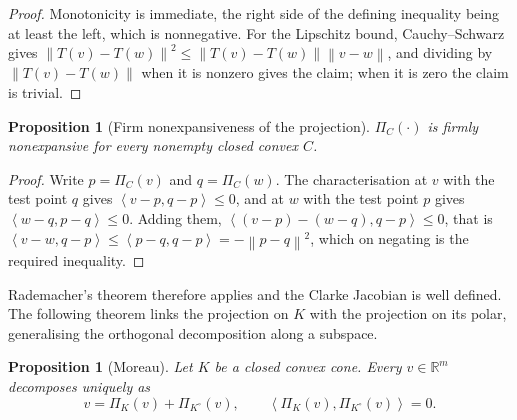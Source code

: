 \documentclass[a4paper,11pt]{book}
\theoremstyle{plain}
\newtheorem{proposition}[theorem]{Proposition}
\theoremstyle{definition}
\theoremstyle{remark}
\numberwithin{equation}{chapter}
\numberwithin{algorithm}{chapter}
\newcommand{\R}{\mathbb{R}}
\newcommand{\proj}[2]{\Pi_{#2}\!\left(#1\right)}
\newcommand{\norm}[1]{\left\|#1\right\|}
\newcommand{\inner}[2]{\left\langle #1, #2 \right\rangle}
\begin{document}
	\begin{proof}
		Monotonicity is immediate, the right side of the defining inequality being at
		least the left, which is nonnegative. For the Lipschitz bound, Cauchy--Schwarz
		gives $\norm{T(v)-T(w)}^2\leq\norm{T(v)-T(w)}\norm{v-w}$, and dividing by
		$\norm{T(v)-T(w)}$ when it is nonzero gives the claim; when it is zero the
		claim is trivial.
	\end{proof}
	
	\begin{proposition}[Firm nonexpansiveness of the projection]
		$\proj{\cdot}{C}$ is firmly nonexpansive for every nonempty closed convex $C$.
	\end{proposition}
	
	\begin{proof}
		Write $p=\proj{v}{C}$ and $q=\proj{w}{C}$. The characterisation at $v$ with the
		test point $q$ gives $\inner{v-p}{q-p}\leq0$, and at $w$ with the test point
		$p$ gives $\inner{w-q}{p-q}\leq0$. Adding them,
		$\inner{(v-p)-(w-q)}{q-p}\leq0$, that is
		$\inner{v-w}{q-p}\leq\inner{p-q}{q-p}=-\norm{p-q}^2$, which on negating is the
		required inequality.
	\end{proof}
	
	
	Rademacher's theorem therefore applies and the Clarke Jacobian is well
	defined. The following theorem links the projection on $K$ with the projection
	on its polar, generalising the orthogonal decomposition along a subspace. 
	
	
	\begin{proposition}[Moreau]
		Let $K$ be a closed convex cone. Every $v\in\R^m$ decomposes uniquely as
		\begin{equation}
			v=\proj{v}{K}+\proj{v}{K^\circ},
			\qquad
			\inner{\proj{v}{K}}{\proj{v}{K^\circ}}=0 .
		\end{equation}
	\end{proposition}
	
\end{document}
